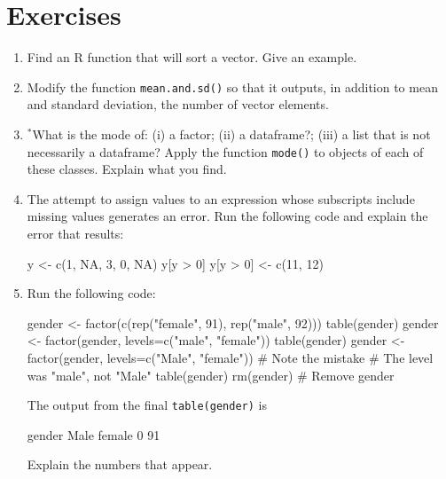 \documentclass{tufte-book}\usepackage[]{graphicx}\usepackage[]{color}
\newcommand{\txtt}[1]{\texttt{#1}}
\begin{document}
\section{Exercises}\label{sec:objects-ex}


\begin{enumerate}

\item  Find an R function that will sort a vector. Give an example.

\item  Modify the function \txtt{mean.and.sd()} so that it outputs,
in addition to mean and standard deviation, the number of
vector elements.

\item $^*$What is the mode of: (i) a factor; (ii) a dataframe?;
(iii) a list that is not necessarily a dataframe?
Apply the function \txtt{mode()} to objects of each
of these classes.  Explain what you find.

\item The attempt to assign values to an expression whose
subscripts include missing values generates an error.
Run the following code and explain the error that results:
\begin{Schunk}
\begin{Sinput}
y <- c(1, NA, 3, 0, NA)
y[y > 0]
y[y > 0] <- c(11, 12)
\end{Sinput}
\end{Schunk}

\item Run the following code:
\begin{fullwidth}

\begin{Schunk}
\begin{Sinput}
gender <- factor(c(rep("female", 91), rep("male", 92)))
table(gender)
gender <- factor(gender, levels=c("male", "female"))
table(gender)
gender <- factor(gender, levels=c("Male", "female")) # Note the mistake
                            # The level was "male", not "Male"
table(gender)
rm(gender)                  # Remove gender
\end{Sinput}
\end{Schunk}

\end{fullwidth}
The output from the final \verb!table(gender)! is

\begin{Schunk}
\begin{Soutput}
gender
  Male female 
     0     91 
\end{Soutput}
\end{Schunk}
Explain the numbers that appear.


\end{enumerate}
\end{document}
